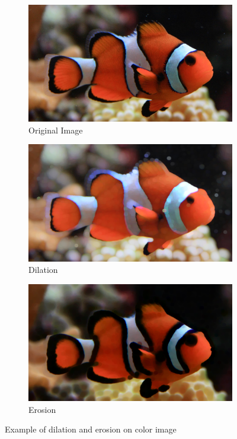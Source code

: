 \begin{figure}[h]
    \centering
    \begin{subfigure}{0.33\textwidth}
        \centering
        \includegraphics[width=.99\linewidth]{images/literature/morphological/nemo}
        \caption{Original Image\cite{website:klovnefisk_image}}
    \end{subfigure}%
    \begin{subfigure}{.33\textwidth}
        \centering
        \includegraphics[width=.99\linewidth]{images/literature/morphological/nemo_dilate}
        \caption{Dilation}
    \end{subfigure}%
    \begin{subfigure}{.33\textwidth}
        \centering
        \includegraphics[width=.99\linewidth]{images/literature/morphological/nemo_erode}
        \caption{Erosion}
    \end{subfigure}
    \caption{Example of dilation and erosion on color image}
    \label{fig:nemo}
\end{figure}




